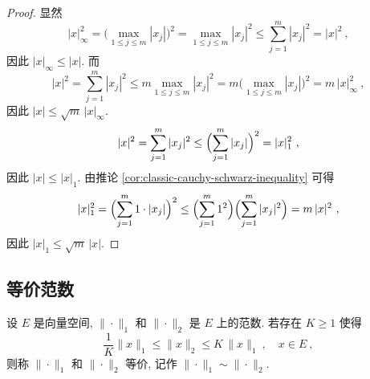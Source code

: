 \begin{proof}
    显然
    \[
        |x|_\infty^2 = \bigl(\max_{1 \leq j \leq m} |x_j|\bigr)^2 = \max_{1 \leq j \leq m} |x_j|^2 \leq \sum_{j = 1}^m |x_j|^2 = |x|^2\ ,
    \]
    因此 \(|x|_\infty \leq |x|\). 而
    \[
        |x|^2 = \sum_{j = 1}^m |x_j|^2 \leq m \max_{1 \leq j \leq m} |x_j|^2 = m \bigl(\max_{1 \leq j \leq m} |x_j|\bigr)^2 = m\, |x|_\infty^2\ ,
    \]
    因此 \(|x| \leq \sqrt{m}\, |x|_\infty\).
    \[
        |x|^2 = \sum_{j = 1}^m |x_j|^2 \leq \Bigl(\sum_{j = 1}^m |x_j|\Bigr)^2 = |x|_1^2\ ,
    \]
    因此 \(|x| \leq |x|_1\). 由推论 \ref{cor:classic-cauchy-schwarz-inequality} 可得
    \[
        |x|_1^2 = \Bigl(\sum_{j = 1}^m 1 \cdot |x_j|\Bigr)^2 \leq \Bigl(\sum_{j = 1}^m 1^2\Bigr) \Bigl(\sum_{j = 1}^m |x_j|^2\Bigr) = m\, |x|^2\ ,
    \]
    因此 \(|x|_1 \leq \sqrt{m}\, |x|\).
\end{proof}

\subsection{等价范数}

\begin{definition}[等价范数]
    设 \(E\) 是向量空间, \(\|\!\cdot\!\|_1\) 和 \(\|\!\cdot\!\|_2\) 是 \(E\) 上的范数. 若存在 \(K \geq 1\) 使得
    \[
        \frac{1}{K} \|x\|_1 \leq \|x\|_2 \leq K\, \|x\|_1\ ,\quad x \in E\ ,
    \]
    则称 \(\|\!\cdot\!\|_1\) 和 \(\|\!\cdot\!\|_2\) 等价, 记作 \(\|\!\cdot\!\|_1 \sim \|\!\cdot\!\|_2\).
\end{definition}

